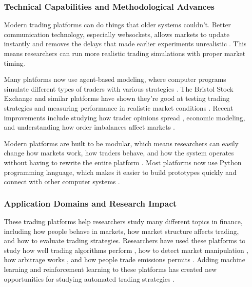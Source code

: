 \subsubsection{Technical Capabilities and Methodological Advances}

Modern trading platforms can do things that older systems couldn't. Better communication technology, especially websockets, allows markets to update instantly and removes the delays that made earlier experiments unrealistic \citep{Crede2019Otree, Washinyira2023Integrating}. This means researchers can run more realistic trading simulations with proper market timing.

Many platforms now use agent-based modeling, where computer programs simulate different types of traders with various strategies \citep{Cliff2019Exhaustive, Snashall2019Adaptive}. The Bristol Stock Exchange and similar platforms have shown they're good at testing trading strategies and measuring performance in realistic market conditions \citep{Cliff2020Methods}. Recent improvements include studying how trader opinions spread \citep{Lomas2021Exploring, Bokhari2022Studying}, economic modeling, and understanding how order imbalances affect markets \citep{Zhang2020Market}.

Modern platforms are built to be modular, which means researchers can easily change how markets work, how traders behave, and how the system operates without having to rewrite the entire platform \citep{Aldrich2019oTree, Chen2016oTree}. Most platforms now use Python programming language, which makes it easier to build prototypes quickly and connect with other computer systems \citep{Mascioli2024Financial}.

\subsubsection{Application Domains and Research Impact}

These trading platforms help researchers study many different topics in finance, including how people behave in markets, how market structure affects trading, and how to evaluate trading strategies. Researchers have used these platforms to study how well trading algorithms perform \citep{Cliff2020Methods}, how to detect market manipulation \citep{Shi2023Neural}, how arbitrage works \citep{Sylvester2022Modeling}, and how people trade emissions permits \citep{Huang2015Experimental}. Adding machine learning and reinforcement learning to these platforms has created new opportunities for studying automated trading strategies \citep{Mascioli2024Financial}.

